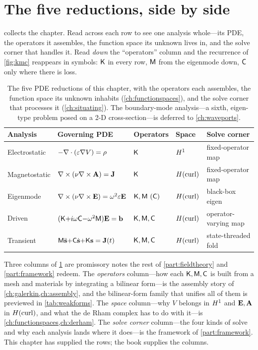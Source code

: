 \section{The five reductions, side by side}

 collects the chapter. Read across each row to see one
analysis whole---its PDE, the operators it assembles, the function space its
unknown lives in, and the solve corner that handles it. Read \emph{down} the
``operators'' column and the recurrence of \cref{fig:kmc} reappears in symbols:
$\mathsf{K}$ in every row, $\mathsf{M}$ from the eigenmode down, $\mathsf{C}$ only where there is
loss.

\begin{table}[t]
\centering
\caption[The five reductions of Maxwell, compared]{The five PDE reductions of
this chapter, with the operators each assembles, the function space its unknown
inhabits (\cref{ch:functionspaces}), and the solve corner that processes it
(\cref{ch:situating}). The boundary-mode analysis---a sixth, eigen-type problem
posed on a 2-D cross-section---is deferred to \cref{ch:waveports}.}
\label{tab:reductions}
\small
\setlength{\tabcolsep}{4pt}
\renewcommand{\arraystretch}{1.25}
\begin{tabular}{@{}lllll@{}}
\toprule
Analysis & Governing PDE & Operators & Space & Solve corner \\
\midrule
Electrostatic
  & $-\nabla\cdot(\varepsilon\nabla V)=\rho$
  & $\mathsf{K}$
  & $H^1$
  & fixed-operator map \\
Magnetostatic
  & $\nabla\times(\nu\nabla\times\mathbf{A})=\mathbf{J}$
  & $\mathsf{K}$
  & $H(\mathrm{curl})$
  & fixed-operator map \\
Eigenmode
  & $\nabla\times(\nu\nabla\times\mathbf{E})=\omega^2\varepsilon\mathbf{E}$
  & $\Kop,\Mop\ (\Cop)$
  & $H(\mathrm{curl})$
  & black-box eigen \\
Driven
  & $(\mathsf{K}{+}i\omega\mathsf{C}{-}\omega^2\mathsf{M})\mathbf{E}=\mathbf{b}$
  & $\mathsf{K},\mathsf{M},\mathsf{C}$
  & $H(\mathrm{curl})$
  & operator-varying map \\
Transient
  & $\mathsf{M}\ddot{\mathbf{s}}{+}\mathsf{C}\dot{\mathbf{s}}{+}\mathsf{K}\mathbf{s}=\mathbf{J}(t)$
  & $\mathsf{K},\mathsf{M},\mathsf{C}$
  & $H(\mathrm{curl})$
  & state-threaded fold \\
\bottomrule
\end{tabular}
\end{table}

Three columns of \cref{tab:reductions} are promissory notes the rest of
\cref{part:fieldtheory} and \cref{part:framework} redeem. The \emph{operators}
column---how each $\mathsf{K},\mathsf{M},\mathsf{C}$ is built from a mesh and materials by
integrating a bilinear form---is the assembly story of
\cref{ch:galerkin,ch:assembly}, and the bilinear-form family that unifies all of
them is previewed in \cref{tab:weakforms}. The \emph{space} column---why $V$
belongs in $H^1$ and $\mathbf{E},\mathbf{A}$ in $H(\mathrm{curl})$, and what the de Rham complex has to
do with it---is \cref{ch:functionspaces,ch:derham}. The \emph{solve corner}
column---the four kinds of solve and why each analysis lands where it does---is
the framework of \cref{part:framework}. This chapter has supplied the rows; the
book supplies the columns.

